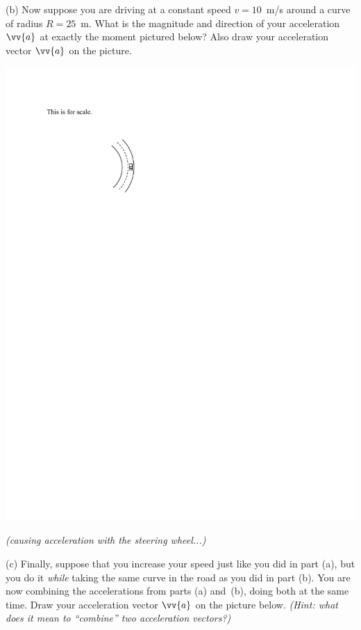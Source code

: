 (b) Now suppose you are driving at a constant speed $v=10$~m/s around a curve of radius $R=25$~m.  What is the magnitude and direction of your acceleration $\vv{a}$ at exactly the moment pictured below?  Also draw your acceleration vector $\vv{a}$ on the picture.

\hspace{1.0in}\includegraphics{tangential_and_centripetal_acc/curve2.pdf} 
\hspace{-0.2in}
\parbox{2.0 in}{\raggedright{\textit{(causing acceleration \linebreak with the steering wheel...)}}}

(c) Finally, suppose that you 
increase your speed just like you did in part (a), but you do it \textit{while} taking the same curve in the road as you did in part (b).   You are now combining the accelerations from parts (a) and~(b), doing both at the same time.  Draw your acceleration vector $\vv{a}$ on the picture below.  \textit{(Hint: what does it mean to ``combine'' two acceleration vectors?)}

